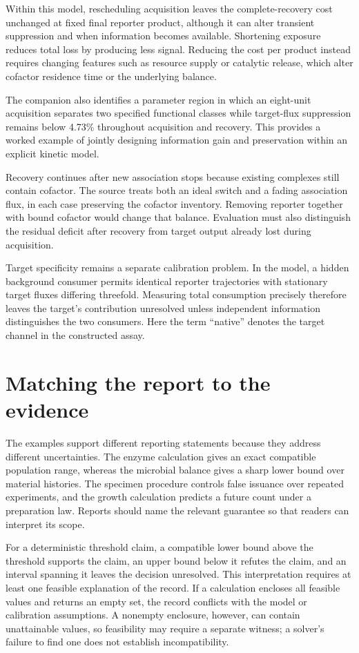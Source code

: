 \documentclass[11pt]{article}
\begin{document}
Within this model, rescheduling acquisition leaves the complete-recovery cost unchanged at fixed final reporter product, although it can alter transient suppression and when information becomes available. Shortening exposure reduces total loss by producing less signal. Reducing the cost per product instead requires changing features such as resource supply or catalytic release, which alter cofactor residence time or the underlying balance.

The companion also identifies a parameter region in which an eight-unit acquisition separates two specified functional classes while target-flux suppression remains below 4.73\% throughout acquisition and recovery. This provides a worked example of jointly designing information gain and preservation within an explicit kinetic model.

Recovery continues after new association stops because existing complexes still contain cofactor. The source treats both an ideal switch and a fading association flux, in each case preserving the cofactor inventory. Removing reporter together with bound cofactor would change that balance. Evaluation must also distinguish the residual deficit after recovery from target output already lost during acquisition.

Target specificity remains a separate calibration problem. In the model, a hidden background consumer permits identical reporter trajectories with stationary target fluxes differing threefold. Measuring total consumption precisely therefore leaves the target's contribution unresolved unless independent information distinguishes the two consumers. Here the term ``native'' denotes the target channel in the constructed assay.

\section{Matching the report to the evidence}
The examples support different reporting statements because they address different uncertainties. The enzyme calculation gives an exact compatible population range, whereas the microbial balance gives a sharp lower bound over material histories. The specimen procedure controls false issuance over repeated experiments, and the growth calculation predicts a future count under a preparation law. Reports should name the relevant guarantee so that readers can interpret its scope.

For a deterministic threshold claim, a compatible lower bound above the threshold supports the claim, an upper bound below it refutes the claim, and an interval spanning it leaves the decision unresolved. This interpretation requires at least one feasible explanation of the record. If a calculation encloses all feasible values and returns an empty set, the record conflicts with the model or calibration assumptions. A nonempty enclosure, however, can contain unattainable values, so feasibility may require a separate witness; a solver's failure to find one does not establish incompatibility.
\end{document}
